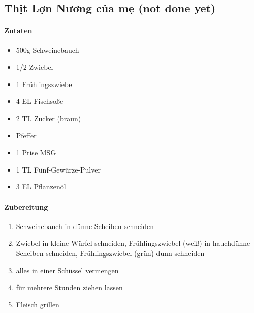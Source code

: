\newpage
{}
\subsection{Thịt Lợn Nương của mẹ (not done yet)}
\paragraph{Zutaten}
\begin{itemize}[noitemsep]
	\item 500g Schweinebauch
	\item 1/2 Zwiebel
	\item 1 Frühlingszwiebel 
	\item 4 EL Fischsoße
	\item 2 TL Zucker (braun)
	\item Pfeffer
	\item 1 Prise MSG
	\item 1 TL Fünf-Gewürze-Pulver
	\item 3 EL Pflanzenöl
\end{itemize}

\paragraph{Zubereitung}
\begin{enumerate}[noitemsep]
	\item Schweinebauch in dünne Scheiben schneiden
	\item Zwiebel in kleine Würfel schneiden, Frühlingszwiebel (weiß) in hauchdünne Scheiben schneiden, Frühlingszwiebel (grün) dunn schneiden
	\item alles in einer Schüssel vermengen
	\item für mehrere Stunden ziehen lassen 
	\item Fleisch grillen
\end{enumerate}